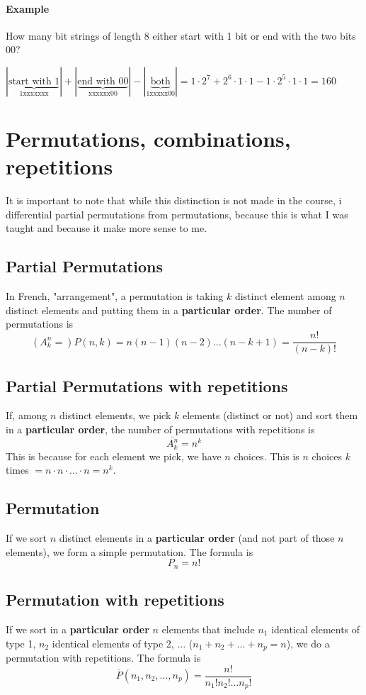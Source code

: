 \documentclass[10pt,a4paper]{book}
\begin{document}
\paragraph*{Example}
How many bit strings of length 8 either start with 1 bit or end with the two bits 00?\par 
$|\underbrace{\text{start with 1}}_{\text{1xxxxxxx}}|+|\underbrace{\text{end with 00}}_{\text{xxxxxx00}}|-|\underbrace{\text{both}}_{\text{1xxxxx00}}| = 1\cdot 2^7+2^6\cdot 1\cdot 1-1\cdot 2^5\cdot 1\cdot 1 = 160$
\section{Permutations, combinations, repetitions}
It is important to note that while this distinction is not made in the course, i differential partial permutations from permutations, because this is what I was taught and because it make more sense to me. 
\subsection{Partial Permutations}
In French, "arrangement", a permutation is taking $k$ distinct element among $n$ distinct elements and putting them in a \textbf{particular order}. The number of permutations is 
\[(A^n_k=)P(n,k) = n(n-1)(n-2)...(n-k+1)=\frac{n!}{(n-k)!}\] 
\subsection*{Partial Permutations with repetitions}
If, among $n$ distinct elements, we pick $k$ elements (distinct or not) and sort them in a \textbf{particular order}, the number of permutations with repetitions is
\[\overline{A^n_k}=n^k\]
This is because for each element we pick, we have $n$ choices. This is $n$ choices $k$ times $=n\cdot n\cdot ...\cdot n=n^k$.
\subsection{Permutation}
If we sort $n$ distinct elements in a \textbf{particular order} (and not part of those $n$ elements), we form a simple permutation. The formula is 
\[P_n = n!\]
\subsection*{Permutation with repetitions}
If we sort in a \textbf{particular order} $n$ elements that include $n_1$ identical elements of type 1, $n_2$ identical elements of type 2, ... ($n_1+n_2+...+n_p=n$), we do a permutation with repetitions. The formula is
\[\overline{P}(n_1,n_2,...,n_p)=\frac{n!}{n_1!n_2!...n_p!}\]
\end{document}
